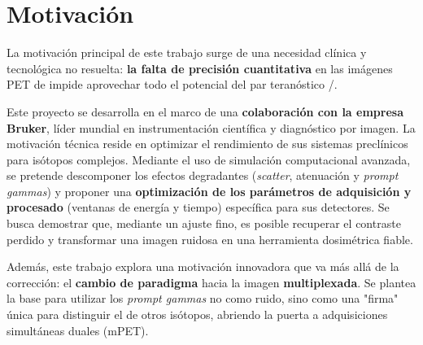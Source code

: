 \section{Motivación}

La motivación principal de este trabajo surge de una necesidad clínica y tecnológica no resuelta: \textbf{la falta de precisión
    cuantitativa} en las imágenes PET de \yochoseis impide aprovechar todo el potencial del par teranóstico \yochoseis/\ynuevecero.

Este proyecto se desarrolla en el marco de una \textbf{colaboración con la empresa Bruker}, líder mundial en instrumentación científica y
diagnóstico por imagen. La motivación técnica reside en optimizar el rendimiento de sus sistemas preclínicos para isótopos complejos.
Mediante el uso de simulación computacional avanzada, se pretende descomponer los efectos degradantes (\emph{scatter}, atenuación y \emph{prompt gammas})
y proponer una \textbf{optimización de los parámetros de adquisición y procesado} (ventanas de energía y tiempo) específica para sus detectores.
Se busca demostrar que, mediante un ajuste fino, es posible recuperar el contraste perdido y transformar una imagen ruidosa en una
herramienta dosimétrica fiable.

Además, este trabajo explora una motivación innovadora que va más allá de la corrección: el \textbf{cambio de paradigma} hacia la imagen
\textbf{multiplexada}. Se plantea la base para utilizar los \emph{prompt gammas} no como ruido, sino como una
"firma" única para distinguir el \yochoseis de otros isótopos, abriendo la puerta a adquisiciones simultáneas duales (mPET).

